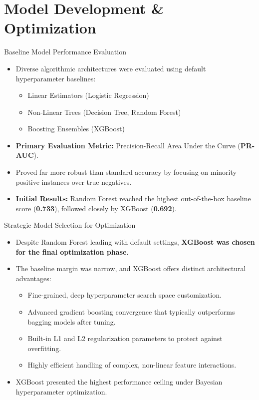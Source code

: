 \section{Model Development \& Optimization}

\begin{frame}{Baseline Model Performance Evaluation}
\begin{itemize}
    \item Diverse algorithmic architectures were evaluated using default hyperparameter baselines:
    \begin{itemize}
        \item Linear Estimators (Logistic Regression)
        \item Non-Linear Trees (Decision Tree, Random Forest)
        \item Boosting Ensembles (XGBoost)
    \end{itemize}
    \item \textbf{Primary Evaluation Metric:} Precision-Recall Area Under the Curve (\textbf{PR-AUC}).
    \item Proved far more robust than standard accuracy by focusing on minority positive instances over true negatives.
    \item \textbf{Initial Results:} Random Forest reached the highest out-of-the-box baseline score (\textbf{0.733}), followed closely by XGBoost (\textbf{0.692}).
\end{itemize}
\end{frame}

\begin{frame}{Strategic Model Selection for Optimization}
\begin{itemize}
    \item Despite Random Forest leading with default settings, \textbf{XGBoost was chosen for the final optimization phase}.
    \item The baseline margin was narrow, and XGBoost offers distinct architectural advantages:
    \begin{itemize}
        \item Fine-grained, deep hyperparameter search space customization.
        \item Advanced gradient boosting convergence that typically outperforms bagging models after tuning.
        \item Built-in L1 and L2 regularization parameters to protect against overfitting.
        \item Highly efficient handling of complex, non-linear feature interactions.
    \end{itemize}
    \item XGBoost presented the highest performance ceiling under Bayesian hyperparameter optimization.
\end{itemize}
\end{frame}

